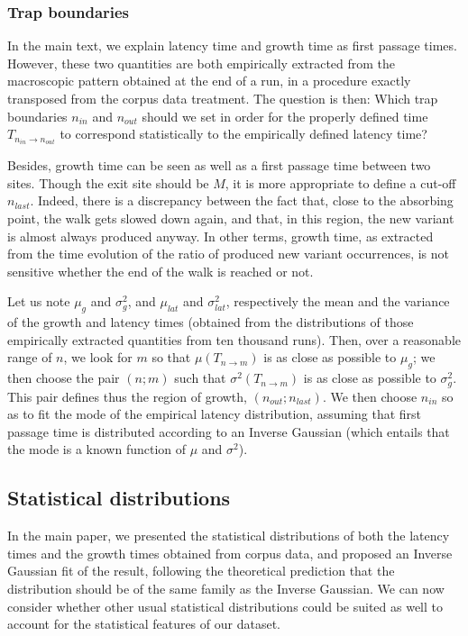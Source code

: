 \documentclass[12pt,twocolumn,amsmath,amssymb,aps,longbibliography]{revtex4-1}  %
\begin{document}
\subsubsection{Trap boundaries}

In the main text, we explain latency time and growth time as first passage times. However, these two quantities are both empirically extracted from the macroscopic pattern obtained at the end of a run, in a procedure exactly transposed from the corpus data treatment. The question is then: Which trap boundaries $n_{in}$ and $n_{out}$ should we set in order for the properly defined time $T_{n_{in} \rightarrow n_{out}}$ to correspond statistically to the empirically defined latency time? 

Besides, growth time can be seen as well as a first passage time between two sites. Though the exit site should be $M$, it is more appropriate to define a cut-off $n_{last}$. Indeed, there is a discrepancy between the fact that, close to the absorbing point, the walk gets slowed down again, and that, in this region, the new variant is almost always produced anyway. In other terms, growth time, as extracted from the time evolution of the ratio of produced new variant occurrences, is not sensitive whether the end of the walk is reached or not. 

Let us note $\mu_g$ and $\sigma^2_g$, and $\mu_{lat}$ and $\sigma^2_{lat}$, respectively the mean and the variance of the growth and latency times (obtained from the distributions of those empirically extracted quantities from ten thousand runs). Then, over a reasonable range of $n$, we look for $m$ so that $\mu \left(T_{n \rightarrow m} \right)$ is as close as possible to $\mu_g$; we then choose the pair $(n;m)$ such that $\sigma ^ 2 \left(T_{n \rightarrow m} \right)$ is as close as possible to $\sigma^2_g$. This pair defines thus the region of growth, $(n_{out};n_{last})$. We then choose $n_{in}$ so as to fit the mode of the empirical latency distribution, assuming that first passage time is distributed according to an Inverse Gaussian (which entails that the mode is a known function of $\mu$ and $\sigma^2$). 

\subsection{Statistical distributions \label{A4}}

In the main paper, we presented the statistical distributions of both the latency times and the growth times obtained from corpus data, and proposed an Inverse Gaussian fit of the result, following the theoretical prediction that the distribution should be of the same family as the Inverse Gaussian. We can now consider whether other usual statistical distributions could be suited as well to account for the statistical features of our dataset.
\end{document}
